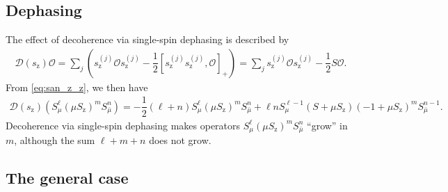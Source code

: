\documentclass[aps,pra,twocolumn,longbibliography]{revtex4-2}
\newcommand{\f}[2]{\dfrac{#1}{#2}} %
\newcommand{\p}[1]{\left( #1 \right)} %
\renewcommand{\sp}[1]{\left[ #1 \right]} %
\newcommand{\D}{\mathcal{D}}
\renewcommand{\O}{\mathcal{O}}
\newcommand{\z}{\text{z}}
\newcommand{\bmu}{{\bar\mu}}
\newcommand{\1}{\mathds{1}}
\begin{document}
\subsection{Dephasing}
\label{sec:dephasing_single}

The effect of decoherence via single-spin dephasing is described by
\begin{align}
  \D\p{s_\z} \O
  = \sum_j\p{s_\z^{(j)} \O s_\z^{(j)}
    - \f12\sp{s_\z^{(j)} s_\z^{(j)},\O}_+}
  = \sum_j s_\z^{(j)} \O s_\z^{(j)} - \f12 S \O.
\end{align}
From \eqref{eq:san_z_z}, we then have
\begin{align}
  \D\p{s_\z} \p{S_\mu^\ell \p{\mu S_\z}^m S_\bmu^n}
  = -\f12\p{\ell+n} S_\mu^\ell \p{\mu S_\z}^m S_\bmu^n
  + \ell n S_\mu^{\ell-1} \p{S + \mu S_\z}
  \p{-1 + \mu S_\z}^m S_\bmu^{n-1}.
\end{align}
Decoherence via single-spin dephasing makes operators
$S_\mu^\ell \p{\mu S_\z}^m S_\bmu^n$ ``grow'' in $m$, although the sum
$\ell+m+n$ does not grow.

\subsection{The general case}
\label{sec:general_single}
\end{document}
